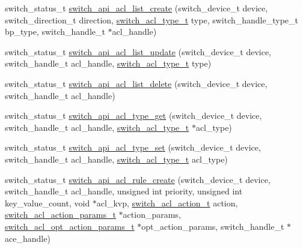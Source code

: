 \begin{DoxyCompactItemize}
\item 
switch\+\_\+status\+\_\+t \hyperlink{group__ACL_ga97f30d9a0366315a7e2e76a198e3821e}{switch\+\_\+api\+\_\+acl\+\_\+list\+\_\+create} (switch\+\_\+device\+\_\+t device, switch\+\_\+direction\+\_\+t direction, \hyperlink{group__ACL_ga01c3d85a9624b16e65bc9272f210e961}{switch\+\_\+acl\+\_\+type\+\_\+t} type, switch\+\_\+handle\+\_\+type\+\_\+t bp\+\_\+type, switch\+\_\+handle\+\_\+t $\ast$acl\+\_\+handle)
\item 
switch\+\_\+status\+\_\+t \hyperlink{group__ACL_ga3fa24ce7836d06b0ddf95332b9729ede}{switch\+\_\+api\+\_\+acl\+\_\+list\+\_\+update} (switch\+\_\+device\+\_\+t device, switch\+\_\+handle\+\_\+t acl\+\_\+handle, \hyperlink{group__ACL_ga01c3d85a9624b16e65bc9272f210e961}{switch\+\_\+acl\+\_\+type\+\_\+t} type)
\item 
switch\+\_\+status\+\_\+t \hyperlink{group__ACL_ga83ecd29819e891b96193673c86df4f2d}{switch\+\_\+api\+\_\+acl\+\_\+list\+\_\+delete} (switch\+\_\+device\+\_\+t device, switch\+\_\+handle\+\_\+t acl\+\_\+handle)
\item 
switch\+\_\+status\+\_\+t \hyperlink{group__ACL_gae7906a9539c5586873bbf54bc65800bb}{switch\+\_\+api\+\_\+acl\+\_\+type\+\_\+get} (switch\+\_\+device\+\_\+t device, switch\+\_\+handle\+\_\+t acl\+\_\+handle, \hyperlink{group__ACL_ga01c3d85a9624b16e65bc9272f210e961}{switch\+\_\+acl\+\_\+type\+\_\+t} $\ast$acl\+\_\+type)
\item 
switch\+\_\+status\+\_\+t \hyperlink{group__ACL_gad0e556c1a3a57c04868f1e65837c91ac}{switch\+\_\+api\+\_\+acl\+\_\+type\+\_\+set} (switch\+\_\+device\+\_\+t device, switch\+\_\+handle\+\_\+t acl\+\_\+handle, \hyperlink{group__ACL_ga01c3d85a9624b16e65bc9272f210e961}{switch\+\_\+acl\+\_\+type\+\_\+t} acl\+\_\+type)
\item 
switch\+\_\+status\+\_\+t \hyperlink{group__ACL_gace1c238f0572a73d27793ce9ffdd19d4}{switch\+\_\+api\+\_\+acl\+\_\+rule\+\_\+create} (switch\+\_\+device\+\_\+t device, switch\+\_\+handle\+\_\+t acl\+\_\+handle, unsigned int priority, unsigned int key\+\_\+value\+\_\+count, void $\ast$acl\+\_\+kvp, \hyperlink{group__ACL_ga9e512fe793010aac7829bb2fbef4764d}{switch\+\_\+acl\+\_\+action\+\_\+t} action, \hyperlink{group__ACL_gaf3edf5029fc2da06c40c02beacb8ab21}{switch\+\_\+acl\+\_\+action\+\_\+params\+\_\+t} $\ast$action\+\_\+params, \hyperlink{group__ACL_gaf6629027c512d3f6976b8cd8eba8c4fb}{switch\+\_\+acl\+\_\+opt\+\_\+action\+\_\+params\+\_\+t} $\ast$opt\+\_\+action\+\_\+params, switch\+\_\+handle\+\_\+t $\ast$ace\+\_\+handle)
\item 

\end{DoxyCompactItemize}
